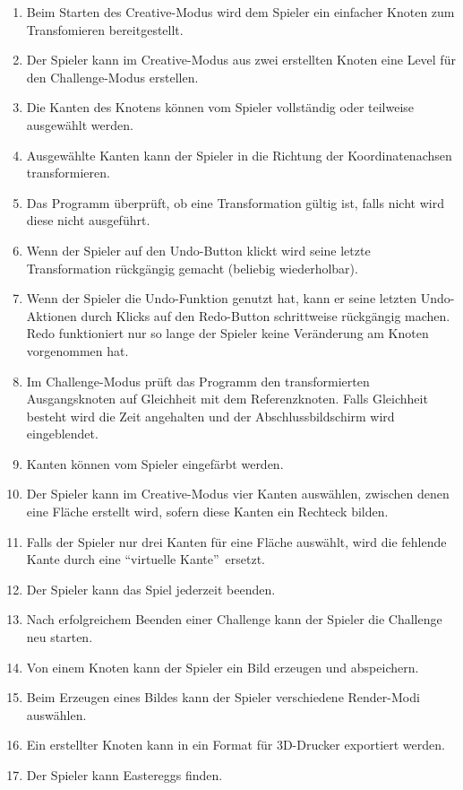\begin{enumerate}[resume]

\item Beim Starten des Creative-Modus wird dem Spieler ein einfacher Knoten zum Transfomieren bereitgestellt.
\item Der Spieler kann im Creative-Modus aus zwei erstellten Knoten eine Level für den Challenge-Modus erstellen.
\item Die Kanten des Knotens können vom Spieler vollständig oder teilweise ausgewählt werden.
\item Ausgewählte Kanten kann der Spieler in die Richtung der Koordinatenachsen transformieren.
\item Das Programm überprüft, ob eine Transformation gültig ist, falls nicht wird diese nicht ausgeführt.
\item Wenn der Spieler auf den Undo-Button klickt wird seine letzte Transformation rückgängig gemacht (beliebig wiederholbar). 
\item Wenn der Spieler die Undo-Funktion genutzt hat, kann er seine letzten Undo-Aktionen durch Klicks auf den Redo-Button schrittweise rückgängig machen. Redo funktioniert nur so lange der Spieler keine Veränderung am Knoten vorgenommen hat. %
\item Im Challenge-Modus prüft das Programm den transformierten Ausgangsknoten auf Gleichheit mit dem Referenzknoten. Falls Gleichheit besteht wird die Zeit angehalten und der Abschlussbildschirm wird eingeblendet.
\item Kanten können vom Spieler eingefärbt werden. %
\item Der Spieler kann im Creative-Modus vier Kanten auswählen, zwischen denen eine Fläche erstellt wird, sofern diese Kanten ein Rechteck bilden. %
\item Falls der Spieler nur drei Kanten für eine Fläche auswählt, wird  die fehlende Kante durch eine \textquotedblleft virtuelle Kante\textquotedblright~ersetzt.
\item Der Spieler kann das Spiel jederzeit beenden.
\item Nach erfolgreichem Beenden einer Challenge kann der Spieler die Challenge neu starten. %
\item Von einem Knoten kann der Spieler ein Bild erzeugen und abspeichern. %
\item Beim Erzeugen eines Bildes kann der Spieler verschiedene Render-Modi auswählen.
\item Ein erstellter Knoten kann in ein Format für 3D-Drucker exportiert werden. %
\item Der Spieler kann Eastereggs finden. %

\end{enumerate}

